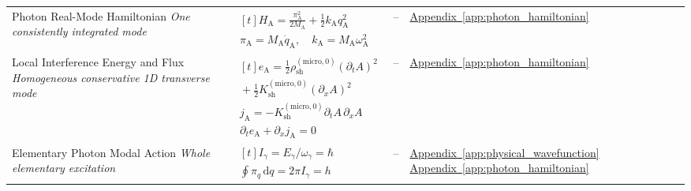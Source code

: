 \begin{longtable}{@{} p{4.5cm} p{6cm} c p{4cm} @{}}
{\raggedright Photon Real-Mode Hamiltonian \newline \textit{One consistently integrated mode}\par} & {\raggedright $\begin{gathered}[t]H_{\mathrm A}=\frac{\pi_{\mathrm A}^2}{2M_{\mathrm A}}+\frac12k_{\mathrm A}q_{\mathrm A}^2 \\ \pi_{\mathrm A}=M_{\mathrm A}\dot q_{\mathrm A},\quad k_{\mathrm A}=M_{\mathrm A}\omega_{\mathrm A}^2\end{gathered}$\par} & -- & {\raggedright \hyperref[app:photon_hamiltonian]{Appendix~\ref*{app:photon_hamiltonian}}\par} \\

{\raggedright Local Interference Energy and Flux \newline \textit{Homogeneous conservative 1D transverse mode}\par} & {\raggedright $\begin{gathered}[t]e_{\mathrm A}=\tfrac12\rho_{\mathrm{sh}}^{(\mathrm{micro},0)}(\partial_tA)^2 \\ {}+\tfrac12K_{\mathrm{sh}}^{(\mathrm{micro},0)}(\partial_xA)^2 \\ j_{\mathrm A}=-K_{\mathrm{sh}}^{(\mathrm{micro},0)}\partial_tA\,\partial_xA \\ \partial_te_{\mathrm A}+\partial_xj_{\mathrm A}=0\end{gathered}$\par} & -- & {\raggedright \hyperref[app:photon_hamiltonian]{Appendix~\ref*{app:photon_hamiltonian}}\par} \\

{\raggedright Elementary Photon Modal Action \newline \textit{Whole elementary excitation}\par} & {\raggedright $\begin{gathered}[t]I_\gamma=E_\gamma/\omega_\gamma=\hbar \\ \oint\pi_q\,\mathrm dq=2\pi I_\gamma=h\end{gathered}$\par} & -- & {\raggedright \hyperref[app:physical_wavefunction]{Appendix~\ref*{app:physical_wavefunction}} \newline \hyperref[app:photon_hamiltonian]{Appendix~\ref*{app:photon_hamiltonian}}\par} \\


\end{longtable}
